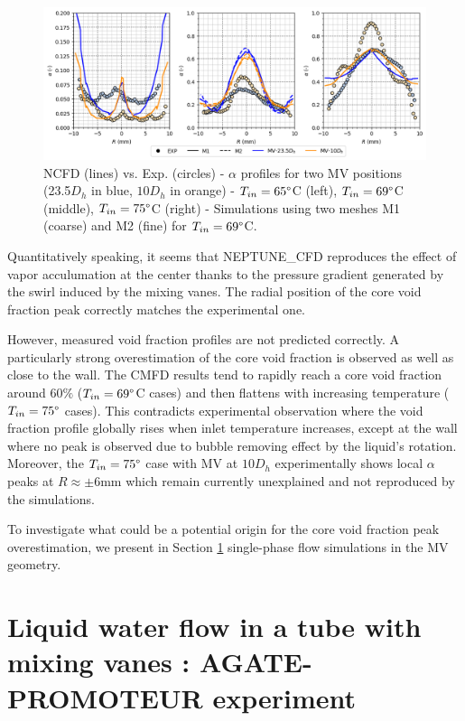%
\begin{figure}[!htb]
\centering
\includegraphics[scale=0.60]{img/DEBORA-Promoteur/alpha_prom.png}
\caption{NCFD (lines) vs. Exp. (circles) - $\alpha$ profiles for two MV positions (23.5$D_{h}$ in blue, $10D_{h}$ in orange) - $T_{in}=65\degree$C (left), $T_{in}=69\degree$C (middle), $T_{in}=75\degree$C (right) - Simulations using two meshes M1 (coarse) and M2 (fine) for $T_{in}=69\degree$C.}
\label{fig:sim_prom}
\end{figure}
%


Quantitatively speaking, it seems that NEPTUNE\_CFD reproduces the effect of vapor acculumation at the center thanks to the pressure gradient generated by the swirl induced by the mixing vanes. The radial position  of the core void fraction peak correctly matches the experimental one. 

However, measured void fraction profiles are not predicted correctly. A particularly strong overestimation of the core void fraction is observed as well as close to the wall. The CMFD results tend to rapidly reach a core void fraction around $60\%$ ($T_{in}=69\degree$C cases) and then flattens with increasing temperature ($T_{in}=75\degree$ cases). This contradicts experimental observation where the void fraction profile globally rises when inlet temperature increases, except at the wall where no peak is observed due to bubble removing effect by the liquid's rotation. Moreover, the $T_{in}=75\degree$ case with MV at $10D_{h}$ experimentally shows local $\alpha$ peaks at $R\approx \pm 6$mm which remain currently unexplained and not reproduced by the simulations. 

To investigate what could be a potential origin for the core void fraction peak overestimation, we present in Section \ref{sec:agate} single-phase flow simulations in the MV geometry.


\section{Liquid water flow in a tube with mixing vanes : AGATE-PROMOTEUR experiment}
\label{sec:agate}

